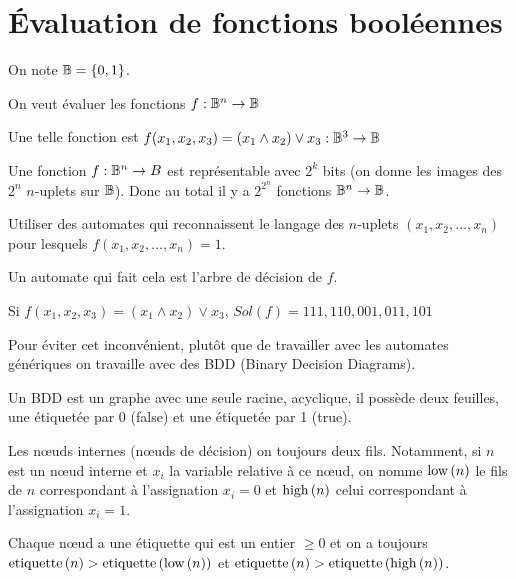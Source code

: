 \section{Évaluation de fonctions booléennes}

\begin{notation}
	On note $\mathbb{B} = \left\{0,1\right\}$.
\end{notation}

On veut évaluer les fonctions $f : \mathbb{B} ^ n \to \mathbb{B}$

\begin{exemple}
	Une telle fonction est $f(x_1,x_2,x_3) = (x_1 \land x_2) \lor x_3 : \mathbb{B}^3 \to \mathbb{B}$
\end{exemple}

Une fonction $f : \mathbb{B} ^ n \to B$ est représentable avec $2^k$ bits
(on donne les images des $2^n$ $n$-uplets sur $\mathbb{B}$).
Donc au total il y a $2^{2^n}$ fonctions $\mathbb{B}^n \to \mathbb{B}$.

\begin{idee}
	Utiliser des automates qui reconnaissent le langage des $n$-uplets
	$(x_1,x_2,\ldots, x_n)$ pour lesquels $f(x_1, x_2, \ldots, x_n) = 1$.
\end{idee}

Un automate qui fait cela est l'arbre de décision de $f$.

\begin{exemple}
	Si $f(x_1,x_2,x_3) = (x_1 \land x_2) \lor x_3$, $Sol(f) = 111,110,001,011,101$

\end{exemple}


Pour éviter cet inconvénient, plutôt que de travailler avec les automates génériques
on travaille avec des BDD (Binary Decision Diagrams).

\begin{definition}
	Un BDD est un graphe avec une seule racine, acyclique, il possède deux feuilles,
	une étiquetée par 0 (false) et une étiquetée par 1 (true).

	Les nœuds internes (nœuds de décision) on toujours deux fils. Notamment, si $n$ est un nœud interne
	et $x_i$ la variable relative à ce nœud, on nomme $\text{low}\left(n\right)$ le fils de $n$ correspondant à l'assignation
	$x_i = 0$ et $\text{high}\left(n\right)$ celui correspondant à l'assignation $x_i = 1$.

	Chaque nœud a une étiquette qui est un entier $\geq 0$ et on a toujours
	$\text{etiquette}\left(n\right) > \text{etiquette}\left(\text{low}\left(n\right)\right)$ et $\text{etiquette}\left(n\right) > \text{etiquette}\left(\text{high}\left(n\right)\right)$.
\end{definition}



